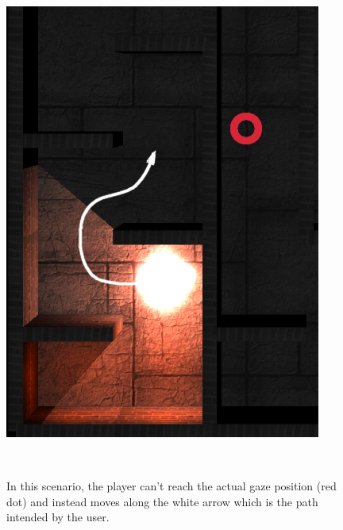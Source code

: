 \documentclass{sigchi}
\begin{document}
\begin{figure}
\centering
  \includegraphics[width=0.9\columnwidth]{figures/algo}
  \caption{In this scenario, the player can't reach the actual gaze position (red dot) and instead moves along the white arrow which is the path intended by the user. }~\label{fig:figure2}
\end{figure}
\end{document}
